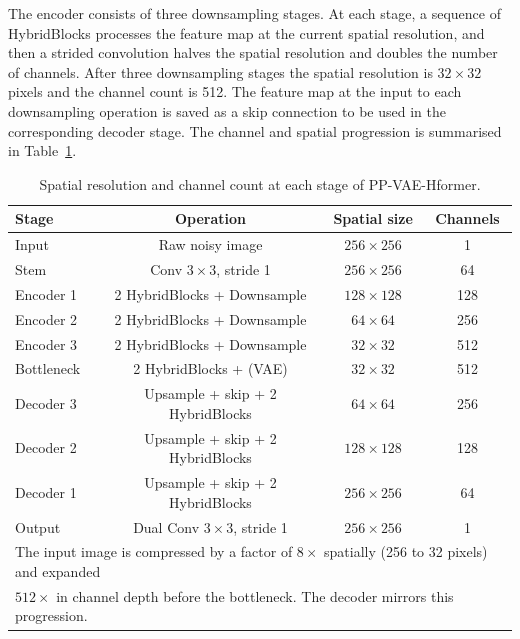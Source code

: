 \documentclass[12pt, a4paper, twoside, openright]{book}
\begin{document}
The encoder consists of three downsampling stages. At each stage, a sequence of
HybridBlocks processes the feature map at the current spatial resolution, and then a
strided convolution halves the spatial resolution and doubles the number of channels. After
three downsampling stages the spatial resolution is $32 \times 32$ pixels and the channel
count is 512. The feature map at the input to each downsampling operation is saved as a
skip connection to be used in the corresponding decoder stage. The channel and spatial
progression is summarised in Table~\ref{tab:methods:channels}.

\begin{table}[htbp]
\centering
\caption{Spatial resolution and channel count at each stage of PP-VAE-Hformer.}
\label{tab:methods:channels}
\begin{tabular}{lccc}
\toprule
\textbf{Stage} & \textbf{Operation} & \textbf{Spatial size} & \textbf{Channels} \\
\midrule
Input      & Raw noisy image                & $256 \times 256$ & 1    \\
Stem       & Conv $3\times3$, stride 1     & $256 \times 256$ & 64   \\
Encoder 1  & 2 HybridBlocks + Downsample   & $128 \times 128$ & 128  \\
Encoder 2  & 2 HybridBlocks + Downsample   & $64 \times 64$   & 256  \\
Encoder 3  & 2 HybridBlocks + Downsample   & $32 \times 32$   & 512  \\
Bottleneck & 2 HybridBlocks + (VAE)        & $32 \times 32$   & 512  \\
Decoder 3  & Upsample + skip + 2 HybridBlocks & $64 \times 64$ & 256  \\
Decoder 2  & Upsample + skip + 2 HybridBlocks & $128 \times 128$ & 128 \\
Decoder 1  & Upsample + skip + 2 HybridBlocks & $256 \times 256$ & 64   \\
Output     & Dual Conv $3\times3$, stride 1 & $256 \times 256$ & 1    \\
\bottomrule
\multicolumn{4}{l}{\footnotesize{The input image is compressed by a factor of $8\times$ spatially (256 to 32 pixels) and expanded}} \\
\multicolumn{4}{l}{\footnotesize{$512\times$ in channel depth before the bottleneck. The decoder mirrors this progression.}} \\
\end{tabular}
\end{table}
\end{document}
